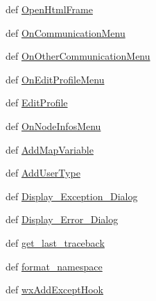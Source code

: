 \begin{CompactItemize}
\item 
def \hyperlink{namespacenetworkedit_0acd7681be496b4948ad18897ea13ac4}{Open\-Html\-Frame}
\item 
def \hyperlink{namespacenetworkedit_85896082081260d8321487b78afeb70e}{On\-Communication\-Menu}
\item 
def \hyperlink{namespacenetworkedit_9e4005cf6d6c158c997d5efb8b9c2694}{On\-Other\-Communication\-Menu}
\item 
def \hyperlink{namespacenetworkedit_36f6066b7c1cdd9298d4e49c8e3aae04}{On\-Edit\-Profile\-Menu}
\item 
def \hyperlink{namespacenetworkedit_5bab65ca0184167cc1b28511385d3222}{Edit\-Profile}
\item 
def \hyperlink{namespacenetworkedit_45c1bba6fe5ef90e41730de7039a937b}{On\-Node\-Infos\-Menu}
\item 
def \hyperlink{namespacenetworkedit_3b5726dbbad16c70542eb1a795e98dfb}{Add\-Map\-Variable}
\item 
def \hyperlink{namespacenetworkedit_29fd99e799c36ab2f01061e1752c89c9}{Add\-User\-Type}
\item 
def \hyperlink{namespacenetworkedit_001372e9d0f0b0629c6516977265dcbc}{Display\_\-Exception\_\-Dialog}
\item 
def \hyperlink{namespacenetworkedit_f360c16d50fb1b076b07b3ea901302ac}{Display\_\-Error\_\-Dialog}
\item 
def \hyperlink{namespacenetworkedit_94d508d0c774a0e391694ebcaa664b96}{get\_\-last\_\-traceback}
\item 
def \hyperlink{namespacenetworkedit_9e8150613da488877091ed43d4892554}{format\_\-namespace}
\item 
def \hyperlink{namespacenetworkedit_5c3ac4301719e50188f9d6fbfe9d140d}{wx\-Add\-Except\-Hook}
\end{CompactItemize}
